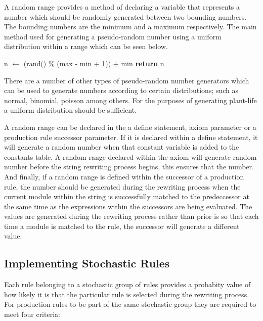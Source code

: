 A random range provides a method of declaring a variable that represents a number which should be randomly generated between two bounding numbers. The bounding numbers are the minimum and a maximum respectively. The main method used for generating a pseudo-random number using a uniform distribution within a range which can be seen below. 

\begin{singlespace}
\begin{algorithm}
\begin{algorithmic}[1]
	\State n $\gets$ (rand() \% (max - min + 1)) + min
	\State \textbf{return} n
\EndProcedure
\end{algorithmic}
\end{algorithm}
\end{singlespace}

\noindent
There are a number of other types of pseudo-random number generators which can be used to generate numbers according to certain distributions; such as normal, binomial, poisson among others. For the purposes of generating plant-life a uniform distribution should be sufficient.

A random range can be declared in the a define statement, axiom parameter or a production rule successor parameter. If it is declared within a define statement, it will generate a random number when that constant variable is added to the constants table. A random range declared within the axiom will generate random number before the string rewriting process begins, this ensures that the number. And finally, if a random range is defined within the successor of a production rule, the number should be generated during the rewriting process when the current module within the string is successfully matched to the predeccessor at the same time as the expressions within the successors are being evaluated. The values are generated during the rewriting process rather than prior is so that each time a module is matched to the rule, the successor will generate a different value. 

\subsection{Implementing Stochastic Rules} \label{stochastic rules}

Each rule belonging to a stochastic group of rules provides a probabity value of how likely it is that the particular rule is selected during the rewriting process. For production rules to be part of the same stochastic group they are required to meet four criteria: 

